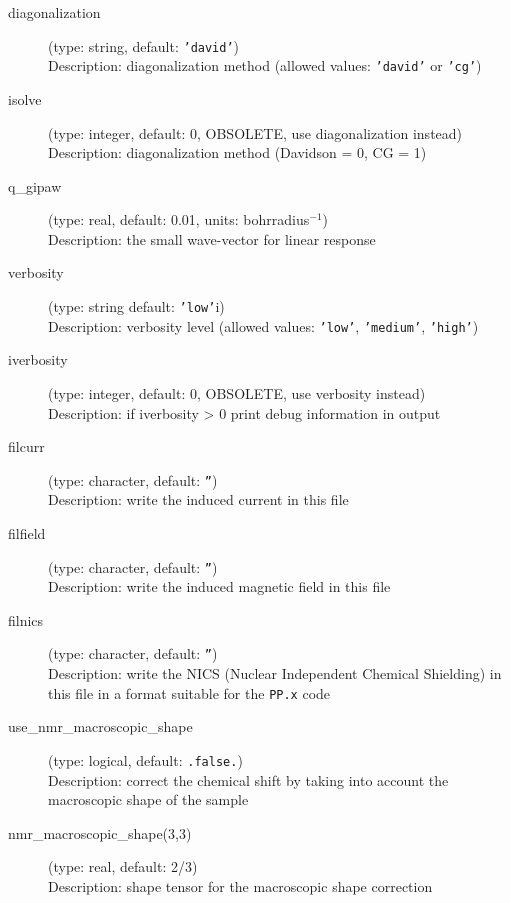 \documentclass[a4paper,11pt,twoside]{article}
\begin{document}
\begin{description}
\item[diagonalization] (type: string, default: \texttt{'david'})\\
Description: diagonalization method (allowed values: \texttt{'david'} or \texttt{'cg'})

\item[isolve] (type: integer, default: 0, OBSOLETE, use diagonalization instead)\\
Description: diagonalization method (Davidson = 0, CG = 1)

\item[q\_gipaw] (type: real, default: 0.01, units: bohrradius$^{-1}$)\\
Description: the small wave-vector for linear response

\item[verbosity] (type: string default: \texttt{'low'}i)\\
Description: verbosity level (allowed values: \texttt{'low'}, \texttt{'medium'}, \texttt{'high'})

\item[iverbosity] (type: integer, default: 0, OBSOLETE, use verbosity instead)\\
Description: if iverbosity {\textgreater} 0 print debug information in output

\item[filcurr] (type: character, default: \texttt{''})\\
Description: write the induced current in this file

\item[filfield] (type: character, default: \texttt{''})\\
Description: write the induced magnetic field in this file

\item[filnics] (type: character, default: \texttt{''})\\
Description: write the NICS (Nuclear Independent Chemical Shielding) in this file
in a format suitable for the \texttt{PP.x} code

\item[use\_nmr\_macroscopic\_shape] (type: logical, default: \texttt{.false.})\\
Description: correct the chemical shift by taking into account the
macroscopic shape of the sample

\item[nmr\_macroscopic\_shape(3,3)] (type: real, default: 2/3)\\
Description: shape tensor for the macroscopic shape correction


\end{description}
\end{document}
